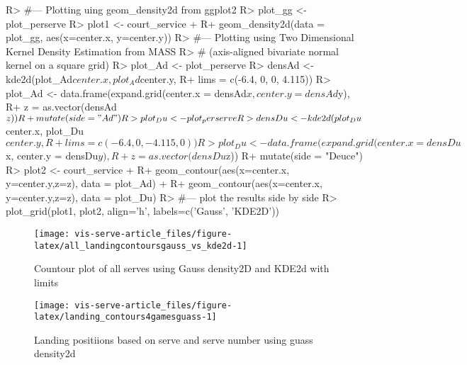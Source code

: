 \documentclass[article]{jss}
\begin{document}
\begin{CodeChunk}
\begin{CodeInput}
R> #--- Plotting uing geom_density2d from ggplot2
R> plot_gg <- plot_perserve %
R> plot1 <- court_service + 
R+     geom_density2d(data = plot_gg, aes(x=center.x, y=center.y))
R> #--- Plotting using Two Dimensional Kernel Density Estimation from MASS 
R> #    (axis-aligned bivariate normal kernel on a square grid)
R> plot_Ad <- plot_perserve %
R> densAd <- kde2d(plot_Ad$center.x, plot_Ad$center.y, 
R+               lims = c(-6.4, 0, 0, 4.115))
R> plot_Ad <- data.frame(expand.grid(center.x = densAd$x, center.y = densAd$y),
R+                      z = as.vector(densAd$z)) %
R+               mutate(side = "Ad")
R> plot_Du <- plot_perserve %
R> densDu <- kde2d(plot_Du$center.x, plot_Du$center.y, 
R+               lims = c(-6.4, 0, -4.115, 0))
R> plot_Du <- data.frame(expand.grid(center.x = densDu$x, center.y = densDu$y),
R+                      z = as.vector(densDu$z)) %
R+               mutate(side = "Deuce")
R> plot2 <- court_service + 
R+   geom_contour(aes(x=center.x, y=center.y,z=z), data = plot_Ad) +
R+   geom_contour(aes(x=center.x, y=center.y,z=z), data = plot_Du)
R> #--- plot the results side by side
R> plot_grid(plot1, plot2, align='h', labels=c('Gauss', 'KDE2D'))
\end{CodeInput}
\begin{figure}

{\centering \texttt{[image: vis-serve-article\_files/figure-latex/all\_landingcontoursgauss\_vs\_kde2d-1]} 

}

\caption[Countour plot of all serves using Gauss density2D and KDE2d with limits]{Countour plot of all serves using Gauss density2D and KDE2d with limits}\label{fig:all_landingcontoursgauss_vs_kde2d}
\end{figure}
\end{CodeChunk}

\begin{CodeChunk}
\begin{figure}

{\centering \texttt{[image: vis-serve-article\_files/figure-latex/landing\_contours4gamesguass-1]} 

}

\caption[Landing positiions based on serve and serve number using guass density2d]{Landing positiions based on serve and serve number using guass density2d}\label{fig:landing_contours4gamesguass}
\end{figure}
\end{CodeChunk}
\end{document}
